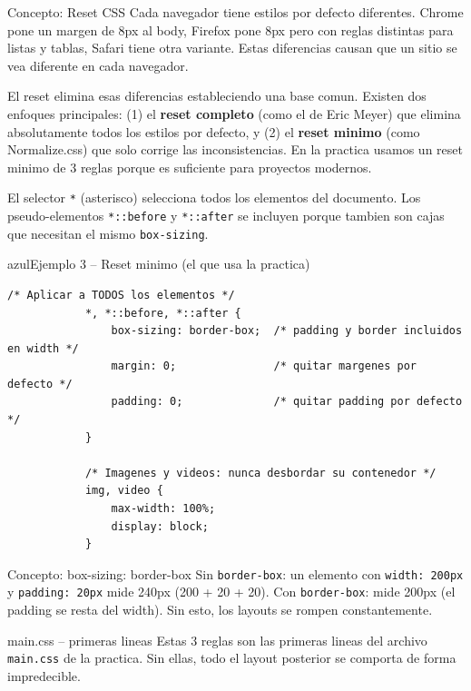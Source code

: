 \documentclass[11pt,a4paper]{article}
\begin{document}
	\begin{cajaconcepto}{Concepto: Reset CSS}
		Cada navegador tiene estilos por defecto diferentes. Chrome pone un margen de 8px al body, Firefox pone 8px pero con reglas distintas para listas y tablas, Safari tiene otra variante. Estas diferencias causan que un sitio se vea diferente en cada navegador.
		
		El reset elimina esas diferencias estableciendo una base comun. Existen dos enfoques principales: (1) el \textbf{reset completo} (como el de Eric Meyer) que elimina absolutamente todos los estilos por defecto, y (2) el \textbf{reset minimo} (como Normalize.css) que solo corrige las inconsistencias. En la practica usamos un reset minimo de 3 reglas porque es suficiente para proyectos modernos.
		
		El selector \texttt{*} (asterisco) selecciona todos los elementos del documento. Los pseudo-elementos \texttt{*::before} y \texttt{*::after} se incluyen porque tambien son cajas que necesitan el mismo \texttt{box-sizing}.
	\end{cajaconcepto}
	
	\begin{cajacodigo}{azul}{Ejemplo 3 -- Reset minimo (el que usa la practica)}
		\begin{lstlisting}[style=codecss]
			/* Aplicar a TODOS los elementos */
			*, *::before, *::after {
				box-sizing: border-box;  /* padding y border incluidos en width */
				margin: 0;               /* quitar margenes por defecto */
				padding: 0;              /* quitar padding por defecto */
			}
			
			/* Imagenes y videos: nunca desbordar su contenedor */
			img, video {
				max-width: 100%;
				display: block;
			}
		\end{lstlisting}
	\end{cajacodigo}
	
	\begin{cajaconcepto}{Concepto: box-sizing: border-box}
		Sin \texttt{border-box}: un elemento con \texttt{width: 200px} y \texttt{padding: 20px} mide 240px (200 + 20 + 20). Con \texttt{border-box}: mide 200px (el padding se resta del width). Sin esto, los layouts se rompen constantemente.
	\end{cajaconcepto}
	
	\begin{cajapractica}{main.css -- primeras lineas}
		Estas 3 reglas son las primeras lineas del archivo \texttt{main.css} de la practica. Sin ellas, todo el layout posterior se comporta de forma impredecible.
	\end{cajapractica}
	
\end{document}
